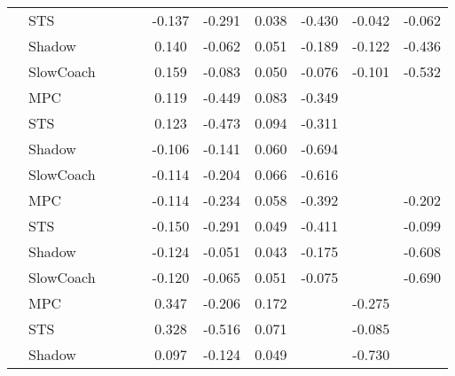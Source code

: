 \begin{tabular}{|l|l|*{9}{c|}}
                                                           & STS &       &        &        & -0.137 & -0.291 &  0.038 &  -0.430 &  -0.042 &   -0.062 \\
                                                           & Shadow &       &        &        &  0.140 & -0.062 &  0.051 &  -0.189 &  -0.122 &   -0.436 \\
                                                           & SlowCoach &       &        &        &  0.159 & -0.083 &  0.050 &  -0.076 &  -0.101 &   -0.532 \\
\midrule
[False, False, False, True, True, True, True, False, False] & MPC &       &        &        &  0.119 & -0.449 &  0.083 &  -0.349 &      &       \\
                                                           & STS &       &        &        &  0.123 & -0.473 &  0.094 &  -0.311 &      &       \\
                                                           & Shadow &       &        &        & -0.106 & -0.141 &  0.060 &  -0.694 &      &       \\
                                                           & SlowCoach &       &        &        & -0.114 & -0.204 &  0.066 &  -0.616 &      &       \\
\midrule
[False, False, False, True, True, True, True, False, True] & MPC &       &        &        & -0.114 & -0.234 &  0.058 &  -0.392 &      &   -0.202 \\
                                                           & STS &       &        &        & -0.150 & -0.291 &  0.049 &  -0.411 &      &   -0.099 \\
                                                           & Shadow &       &        &        & -0.124 & -0.051 &  0.043 &  -0.175 &      &   -0.608 \\
                                                           & SlowCoach &       &        &        & -0.120 & -0.065 &  0.051 &  -0.075 &      &   -0.690 \\
\midrule
[False, False, False, True, True, True, False, True, False] & MPC &       &        &        &  0.347 & -0.206 &  0.172 &      &  -0.275 &       \\
                                                           & STS &       &        &        &  0.328 & -0.516 &  0.071 &      &  -0.085 &       \\
                                                           & Shadow &       &        &        &  0.097 & -0.124 &  0.049 &      &  -0.730 &       \\

\end{tabular}
